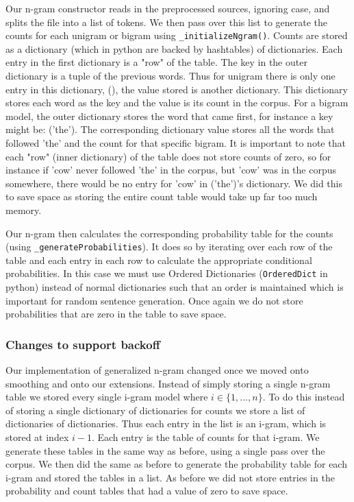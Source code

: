 \documentclass{article}
\begin{document}
Our n-gram constructor reads in the preprocessed sources, ignoring case, and splits the file into a list of tokens. We then pass over this list to generate the counts for each unigram or bigram using \texttt{\_initializeNgram()}. Counts are stored as a dictionary (which in python are  backed by hashtables) of dictionaries. Each entry in the first dictionary is a "row" of the table. The key in the outer dictionary is a tuple of the previous words. Thus for unigram there is only one entry in this dictionary, (), the value stored is another dictionary. This dictionary stores each word as the key and the value is its count in the corpus. For a bigram model, the outer dictionary stores the word that came first, for instance a key might be: ('the'). The corresponding dictionary value stores all the words that followed 'the' and the count for that specific bigram. It is important to note that each "row" (inner dictionary) of the table does not store counts of zero, so for instance if 'cow' never followed 'the' in the corpus, but 'cow' was in the corpus somewhere, there would be no entry for 'cow' in ('the')'s dictionary. We did this to save space as storing the entire count table would take up far too much memory. 

Our n-gram then calculates the corresponding probability table for the counts (using \texttt{\_generateProbabilities}). It does so by iterating over each row of the table and each entry in each row to calculate the appropriate conditional probabilities. In this case we must use Ordered Dictionaries (\texttt{OrderedDict} in python) instead of normal dictionaries such that an order is maintained which is important for random sentence generation. Once again we do not store probabilities that are zero in the table to save space. 

\subsubsection{Changes to support backoff}
Our implementation of generalized n-gram changed once we moved onto smoothing and onto our extensions. Instead of simply storing a single n-gram table we stored every single i-gram model where $i\in \lbrace 1,...,n \rbrace$. To do this instead of storing a single dictionary of dictionaries for counts we store a list of dictionaries of dictionaries. Thus each entry in the list is an i-gram, which is stored at index $i-1$. Each entry is the table of counts for that i-gram. We generate these tables in the same way as before, using a single pass over the corpus. We then did the same as before to generate the probability table for each i-gram and stored the tables in a list. As before we did not store entries in the probability and count tables that had a value of zero to save space.
\end{document}
